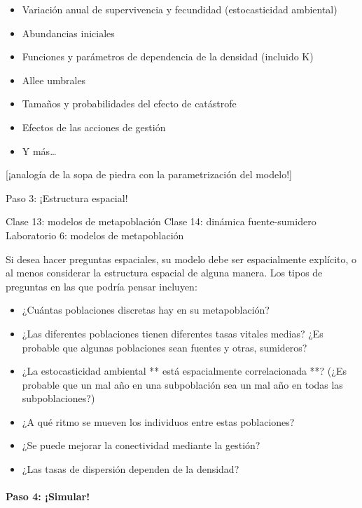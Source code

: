 \documentclass[
]{article}
\providecommand{\tightlist}{%
  \setlength{\itemsep}{0pt}\setlength{\parskip}{0pt}}
\begin{document}
\begin{itemize}
\tightlist
\item
  Variación anual de supervivencia y fecundidad (estocasticidad
  ambiental)
\item
  Abundancias iniciales
\item
  Funciones y parámetros de dependencia de la densidad (incluido K)
\item
  Allee umbrales
\item
  Tamaños y probabilidades del efecto de catástrofe
\item
  Efectos de las acciones de gestión
\item
  Y más\ldots{}
\end{itemize}

{[}¡analogía de la sopa de piedra con la parametrización del modelo!{]}

Paso 3: ¡Estructura espacial!

Clase 13: modelos de metapoblación Clase 14: dinámica fuente-sumidero
Laboratorio 6: modelos de metapoblación

Si desea hacer preguntas espaciales, su modelo debe ser espacialmente
explícito, o al menos considerar la estructura espacial de alguna
manera. Los tipos de preguntas en las que podría pensar incluyen:

\begin{itemize}
\tightlist
\item
  ¿Cuántas poblaciones discretas hay en su metapoblación?
\item
  ¿Las diferentes poblaciones tienen diferentes tasas vitales medias?
  ¿Es probable que algunas poblaciones sean fuentes y otras, sumideros?
\item
  ¿La estocasticidad ambiental ** está espacialmente correlacionada **?
  (¿Es probable que un mal año en una subpoblación sea un mal año en
  todas las subpoblaciones?)
\item
  ¿A qué ritmo se mueven los individuos entre estas poblaciones?
\item
  ¿Se puede mejorar la conectividad mediante la gestión?
\item
  ¿Las tasas de dispersión dependen de la densidad?
\end{itemize}

\hypertarget{paso-4-simular}{%
\paragraph{Paso 4: ¡Simular!}\label{paso-4-simular}}
\end{document}

